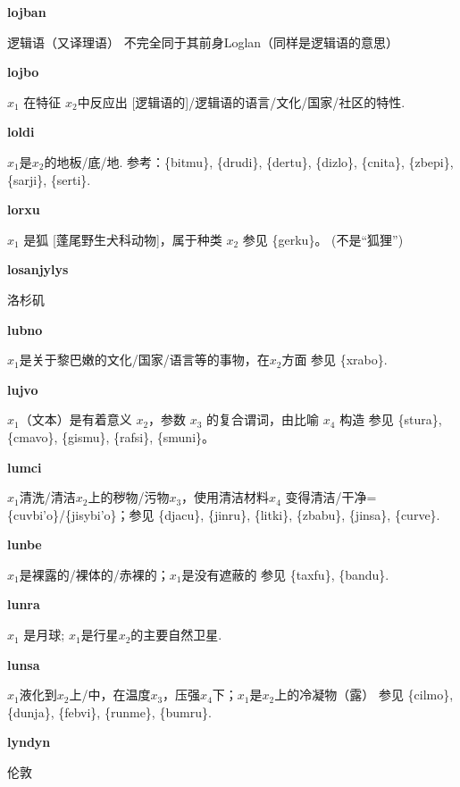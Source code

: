 \documentclass[notitlepage,twocolumn,a4paper,10pt]{book}
\begin{document}
{\sffamily\bfseries lojban} 逻辑语（又译理语） \textemdash{} 不完全同于其前身Loglan（同样是逻辑语的意思）

{\sffamily\bfseries lojbo}  $x_{1}$ 在特征 $x_{2}$中反应出 [逻辑语的]\slash{}逻辑语的语言\slash{}文化\slash{}国家\slash{}社区的特性.

{\sffamily\bfseries loldi}  $x_1$是$x_2$的地板\slash{}底\slash{}地. \textemdash{} 参考：\{bitmu\}, \{drudi\}, \{dertu\}, \{dizlo\}, \{cnita\}, \{zbepi\}, \{sarji\}, \{serti\}.

{\sffamily\bfseries lorxu}\enspace {\ttfamily\bfseries[lor     lo'u]}  $x_1$ 是狐 [蓬尾野生犬科动物]，属于种类 $x_2$ \textemdash{} 参见 \{gerku\}。 (不是“狐狸”)

{\sffamily\bfseries losanjylys} 洛杉矶

{\sffamily\bfseries lubno}\enspace {\ttfamily\bfseries[        lu'o]}  $x_1$是关于黎巴嫩的文化\slash{}国家\slash{}语言等的事物，在$x_2$方面 \textemdash{} 参见 \{xrabo\}.

{\sffamily\bfseries lujvo}  $x_1$（文本）是有着意义 $x_2$，参数 $x_3$ 的复合谓词，由比喻 $x_4$ 构造 \textemdash{} 参见 \{stura\}, \{cmavo\}, \{gismu\}, \{rafsi\}, \{smuni\}。

{\sffamily\bfseries lumci}\enspace {\ttfamily\bfseries[lum     lu'i]}  $x_1$清洗\slash{}清洁$x_2$上的秽物\slash{}污物$x_3$，使用清洁材料$x_4$ \textemdash{} 变得清洁\slash{}干净=\{cuvbi'o\}\slash{}\{jisybi'o\}；参见 \{djacu\}, \{jinru\}, \{litki\}, \{zbabu\}, \{jinsa\}, \{curve\}.

{\sffamily\bfseries lunbe}\enspace {\ttfamily\bfseries[lub]}  $x_1$是裸露的\slash{}裸体的\slash{}赤裸的；$x_1$是没有遮蔽的 \textemdash{} 参见 \{taxfu\}, \{bandu\}.

{\sffamily\bfseries lunra}\enspace {\ttfamily\bfseries[lur]}  $x_1$ 是月球; $x_1$是行星$x_2$的主要自然卫星.

{\sffamily\bfseries lunsa}\enspace {\ttfamily\bfseries[lus]}  $x_1$液化到$x_2$上\slash{}中，在温度$x_3$，压强$x_4$下；$x_1$是$x_2$上的冷凝物（露） \textemdash{} 参见 \{cilmo\}, \{dunja\}, \{febvi\}, \{runme\}, \{bumru\}.

{\sffamily\bfseries lyndyn} 伦敦
\end{document}
